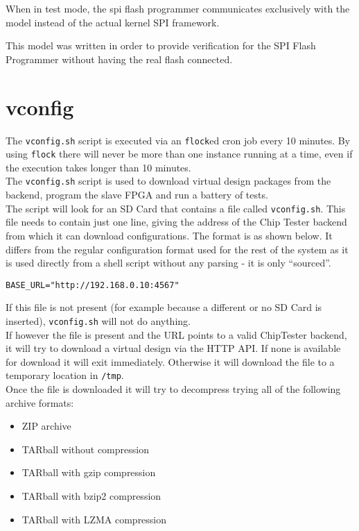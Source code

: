 When in test mode, the spi flash programmer communicates exclusively with the model
instead of the actual kernel SPI framework.

This model was written in order to provide verification for the SPI Flash Programmer
without having the real flash connected.


\newpage
\section{vconfig}
The \texttt{vconfig.sh} script is executed via an \texttt{flock}ed cron job every 10 minutes.
By using \texttt{flock} there will never be more than one instance running at a time, even if
the execution takes longer than 10 minutes.
\\

The \texttt{vconfig.sh} script is used to download virtual design packages from the
backend, program the slave FPGA and run a battery of tests.
\\

The script will look for an SD Card that contains a file called \texttt{vconfig.sh}. This
file needs to contain just one line, giving the address of the Chip Tester backend from
which it can download configurations. The format is as shown below. It differs from the
regular configuration format used for the rest of the system as it is used directly from
a shell script without any parsing - it is only ``sourced''.
\lstset{basicstyle=\scriptsize\ttfamily}
\begin{lstlisting}
BASE_URL="http://192.168.0.10:4567"
\end{lstlisting}

If this file is not present (for example because a different or no SD Card is inserted),
\texttt{vconfig.sh} will not do anything.
\\

If however the file is present and the URL points to a valid ChipTester backend, it will
try to download a virtual design via the HTTP API. If none is available for download it
will exit immediately. Otherwise it will download the file to a temporary location in \texttt{/tmp}.
\\

Once the file is downloaded it will try to decompress trying all of the following archive formats:
\begin{itemize}
 \item ZIP archive
 \item TARball without compression
 \item TARball with gzip compression
 \item TARball with bzip2 compression
 \item TARball with LZMA compression 
\end{itemize}

